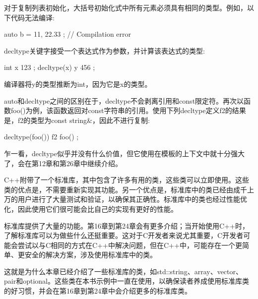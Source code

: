 对于复制列表初始化，大括号初始化式中所有元素必须具有相同的类型。例如，以下代码无法编译:

\begin{cpp}
auto b = { 11, 22.33 }; // Compilation error
\end{cpp}


decltype关键字接受一个表达式作为参数，并计算该表达式的类型:

\begin{cpp}
int x { 123 };
decltype(x) y { 456 };
\end{cpp}

编译器将y的类型推断为int，因为它是x的类型。

auto和decltype之间的区别在于，decltype不会剥离引用和const限定符。再次以函数foo()为例，该函数返回对const字符串的引用。使用下列decltype定义f2的结果是，f2的类型为const string\&，因此不进行复制:

\begin{cpp}
decltype(foo()) f2 { foo() };
\end{cpp}

乍一看，decltype似乎并没有什么价值，但它使用在模板的上下文中就十分强大了，会在第12章和第26章中继续介绍。


C++附带了一个标准库，其中包含了许多有用的类，这些类可以立即使用。这些类的优点是，不需要重新实现其功能。另一个优点是，标准库中的类已经由成千上万的用户进行了大量测试和验证，以确保其正确性。标准库中的类也经过性能优化，因此使用它们很可能会比自己的实现有更好的性能。

标准库提供了大量的功能。第16章到第24章会有更多介绍；当开始使用C++时，了解标准库可以为做些什么还挺重要。这对于C开发者来说尤其重要，C开发者可能会尝试以与C相同的方式在C++中解决问题，但在C++中，可能存在一个更简单、更安全的解决方案，涉及使用标准库中的类。

这就是为什么本章已经介绍了一些标准库的类，如std::string、array、vector、pair和optional。这些类在本书示例中一直在使用，以确保读者养成使用标准库类的好习惯，并会在第16章到第24章中会介绍更多的标准库类。







